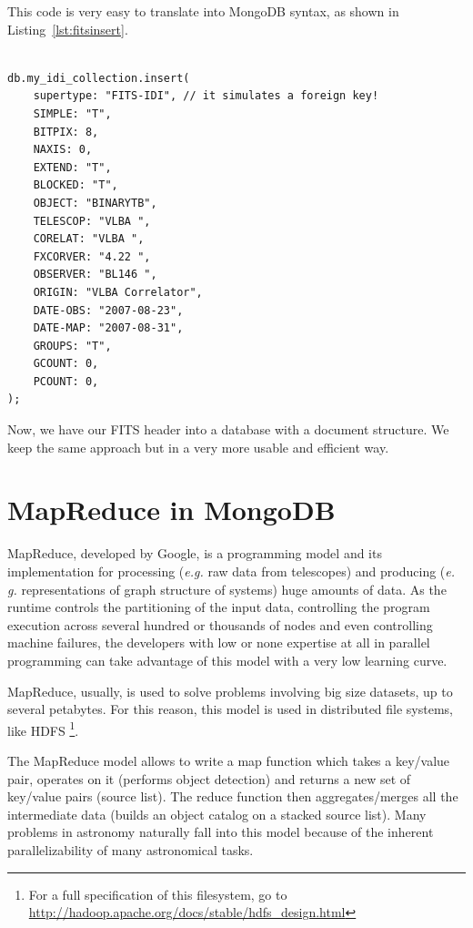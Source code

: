 This code is very easy to translate into MongoDB syntax, as shown in Listing~\ref{lst:fitsinsert}.

\begin{lstlisting}[float,label=lst:fitsinsert,caption=MongoDB BSON code for adding FITS metadata to the NoSQL database.]

db.my_idi_collection.insert(
    supertype: "FITS-IDI", // it simulates a foreign key!
    SIMPLE: "T",
    BITPIX: 8,
    NAXIS: 0,
    EXTEND: "T",
    BLOCKED: "T",
    OBJECT: "BINARYTB",
    TELESCOP: "VLBA ",
    CORELAT: "VLBA ",
    FXCORVER: "4.22 ",
    OBSERVER: "BL146 ",
    ORIGIN: "VLBA Correlator",
    DATE-OBS: "2007-08-23",
    DATE-MAP: "2007-08-31",
    GROUPS: "T",
    GCOUNT: 0,
    PCOUNT: 0,
);

\end{lstlisting}

Now, we have our FITS header into a database with a document structure. We keep the same approach but in a very more usable and efficient way.


\section{MapReduce in MongoDB}

MapReduce, developed by Google, is a programming model and its implementation for processing (\textit{e.g.} raw data from telescopes) and producing (\textit{e. g.} representations of graph structure of systems) huge amounts of data. As the runtime controls the partitioning of the input data, controlling the program execution across several hundred or thousands of nodes and even controlling machine failures, the developers with low or none expertise at all in parallel programming can take advantage of this model with a very low learning curve.

MapReduce, usually, is used to solve problems involving big size datasets, up to several petabytes. For this reason, this model is used in distributed file systems, like HDFS \footnote{For a full specification of this filesystem, go to \url{http://hadoop.apache.org/docs/stable/hdfs_design.html}}.

The MapReduce model allows to write a map function which takes a key/value pair, operates on it (performs object detection) and returns a new set of key/value pairs (source list). The reduce function then aggregates/merges all the intermediate data (builds an object catalog on a stacked source list). Many problems in astronomy naturally fall into this model because of the inherent parallelizability of many astronomical tasks.

